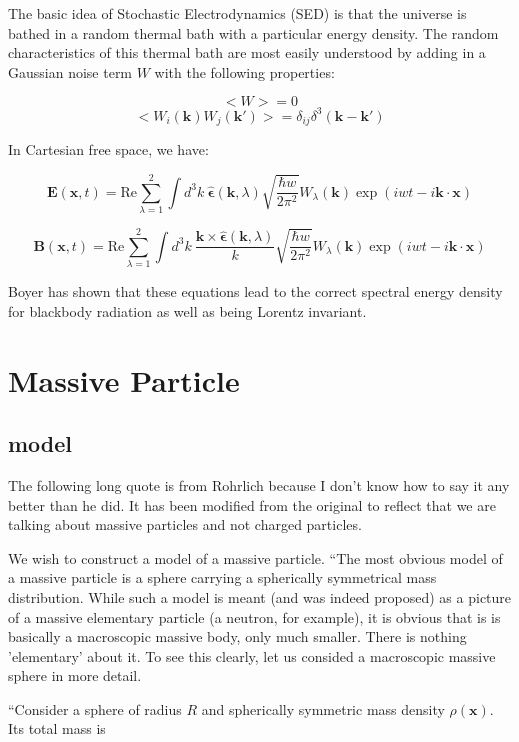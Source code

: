 \documentclass {article}
\renewcommand\vec{\mathbf}
\let\OldHat\hat
\renewcommand{\hat}[1]{\OldHat{\mathbf{#1}}}
\begin{document}
The basic idea of Stochastic Electrodynamics (SED) is that the universe is bathed in a random thermal bath with a particular energy density. The random characteristics of this thermal bath are most easily understood by adding in a Gaussian noise term $W$ with the following properties:

$$<W> = 0$$
$$<W_i (\vec k) W_j (\vec k') > = \delta_{ij} \delta^3(\vec k - \vec k')$$

In Cartesian free space, we have:

$$\vec E (\vec x ,  t) = \text {Re} \sum_{\lambda = 1}^2  \int d^3k ~ \hat \epsilon(\vec k, \lambda) \sqrt {\frac {\hbar w} {2 \pi^2}} W_{\lambda}(\vec k) \exp(iwt - i\vec k \cdot \vec x)$$

$$\vec B (\vec x ,  t) = \text {Re} \sum_{\lambda = 1}^2  \int d^3k ~ \frac {\vec k \times \hat \epsilon(\vec k, \lambda)} k \sqrt {\frac {\hbar w} {2 \pi^2}} W_{\lambda}(\vec k) \exp(iwt - i\vec k \cdot \vec x)$$


Boyer has shown that these equations lead to the correct spectral energy density for blackbody radiation as well as being Lorentz invariant.




\newpage

\section{Massive Particle}
\subsection{model}
The following long quote is from Rohrlich because I don't know how to say it any better than he did. It has been modified from the original to reflect that we are talking about massive particles and not charged particles.

We wish to construct a model of a massive particle. ``The most obvious model of a massive particle is a sphere carrying a spherically symmetrical mass distribution. While such a model is meant (and was indeed proposed) as a picture of a massive elementary particle (a neutron, for example), it is obvious that is is basically a macroscopic massive body, only much smaller. There is nothing 'elementary' about it. To see this clearly, let us consided a macroscopic massive sphere in more detail.

``Consider a sphere of radius $R$ and spherically symmetric mass density $\rho (\vec x)$. Its total mass is
\end{document}
